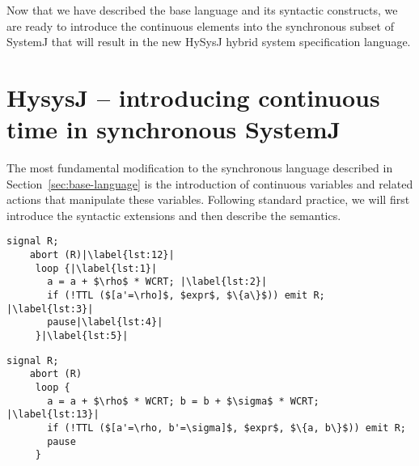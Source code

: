 \documentclass[10pt,journal,cspaper,compsoc]{IEEEtran}
\begin{document}
Now that we have described the base language and its syntactic
constructs, we are ready to introduce the continuous elements into the
synchronous subset of SystemJ that will result in the new HySysJ hybrid
system specification language.

\section{HysysJ -- introducing continuous time in synchronous SystemJ}
\label{sec:example-driv-inform}

The most fundamental modification to the synchronous language described
in Section~\ref{sec:base-language} is the introduction of continuous
variables and related actions that manipulate these variables. Following
standard practice, we will first introduce the syntactic extensions and
then describe the semantics.

\newbox{\rgone}
\begin{lrbox}{\rgone}
  \begin{lstlisting}[mathescape,style=sysj,morekeywords={signal,loop,abort,await,emit,present,trap,pause,exit,delay,suspend},escapechar=|]
    signal R;
    abort (R)|\label{lst:12}| 
     loop {|\label{lst:1}|
       a = a + $\rho$ * WCRT; |\label{lst:2}|
       if (!TTL ($[a'=\rho]$, $expr$, $\{a\}$)) emit R; |\label{lst:3}|
       pause|\label{lst:4}|
     }|\label{lst:5}|
  \end{lstlisting}
\end{lrbox}

\newbox{\rgtwo}
\begin{lrbox}{\rgtwo}
  \begin{lstlisting}[mathescape,style=sysj,morekeywords={signal,loop,abort,await,emit,present,trap,pause,exit,delay,suspend},escapechar=|]
    signal R;
    abort (R) 
     loop {
       a = a + $\rho$ * WCRT; b = b + $\sigma$ * WCRT; |\label{lst:13}|
       if (!TTL ($[a'=\rho, b'=\sigma]$, $expr$, $\{a, b\}$)) emit R; 
       pause
     }
  \end{lstlisting}
\end{lrbox}
\end{document}
